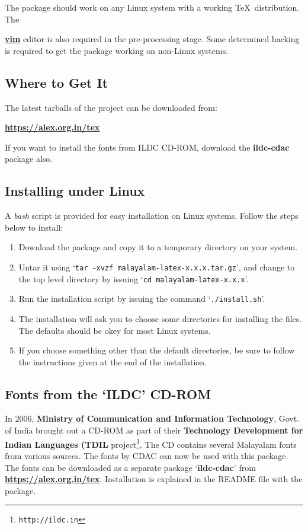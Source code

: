 \documentclass[12pt]{article}
\begin{document}
The package should work on any Linux system
with a working \TeX\ distribution.
The {\href{http://www.vim.org}{{\bfseries vim}} editor is also
required in the pre-processing stage.
Some determined hacking is required to get the
package working on non-Linux systems. 

\subsection{Where to Get It}

The latest tarballs of the project can be downloaded from:

{\href{https://alex.org.in/tex}{\bfseries https://alex.org.in/tex}}

If you want to install the fonts from ILDC CD-ROM,
download the \textbf{ildc-cdac} package also.

\subsection{Installing under Linux}

A {\itshape bash} script is provided for easy installation
on Linux systems. Follow the steps below to install:

\begin{enumerate}
\item Download the package and copy it to a temporary
directory on your system.
\item Untar it using `{\tt tar -xvzf malayalam-latex-x.x.x.tar.gz}',
and change to the top level directory by issuing
`{\tt cd malayalam-latex-x.x.x}'.
\item Run the installation script by issuing the
command `{\tt ./install.sh}'.
\item The installation will ask you to choose some
directories for installing the files. The defaults
should be okey for most Linux systems.
\item If you choose something other than the default
directories, be sure to follow the instructions given
at the end of the installation.
\end{enumerate}

\subsection{Fonts from the `ILDC' CD-ROM}

In 2006, \textbf{Ministry of Communication and Information Technology}, Govt. of India
brought out a CD-ROM as part of their \textbf{Technology Development for Indian Languages
(TDIL} project\footnote{\texttt{http://ildc.in}}. The CD contains several Malayalam fonts
from various sources. The fonts by CDAC can now be used with this package. The fonts
can be downloaded as a separate package `\textbf{ildc-cdac}' from 
{\href{https://alex.org.in/tex}{\bfseries https://alex.org.in/tex}}. Installation
is explained in the README file with the package.


}
\end{document}

